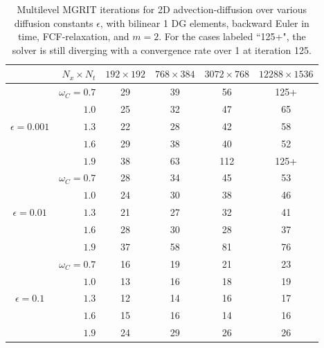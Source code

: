 \documentclass[VANCOUVER,STIX1COL]{WileyNJD-v2}
\begin{document}
\begin{table}[h!]
\centering
\begin{tabular}{c r|c|c|c|c}
     & $N_x \times N_t$ & $192 \times 192$ & $768 \times 384$ & $3072 \times 768$ & $12288 \times 1536$ \\  \toprule
     \multirow{5}{*}{$\epsilon=0.001$} & $\omega_C=0.7$  & 29  & 39  & 56  & 125+ \\ 
     &$1.0$           & 25 & 32 & 47 & 65 \\ 
     &$1.3$           & 22 & 28 & 42 & 58 \\ 
     &$1.6$           & 29 & 38 & 40 & 52 \\ 
     &$1.9$           & 38 & 63 & 112& 125+ \\ \midrule
     \multirow{5}{*}{$\epsilon=0.01$} & $\omega_C=0.7$  & 28 & 34 & 45 & 53 \\ 
     & $1.0$          & 24 & 30 & 38 & 46 \\ 
     &$1.3$           & 21 & 27 & 32 & 41 \\ 
     &$1.6$           & 28 & 30 & 28 & 37 \\ 
     &$1.9$           & 37 & 58 & 81 & 76 \\  \midrule
     \multirow{5}{*}{$\epsilon=0.1$} & $\omega_C=0.7$ & 16 & 19 & 21 & 23 \\ 
     & $1.0$          & 13 & 16 & 18 & 19 \\ 
     &$1.3$           & 12 & 14 & 16 & 17 \\ 
     &$1.6$           & 15 & 16 & 14 & 16 \\ 
     &$1.9$           & 24 & 29 & 26 & 26 \\ \bottomrule
\end{tabular}
\caption{Multilevel MGRIT iterations for 2D advection-diffusion over various diffusion constants $\epsilon$, with bilinear 1 DG elements, backward Euler in time, FCF-relaxation, and $m=2$.  For the cases labeled ``125+", the solver is still diverging with a convergence rate over 1 at iteration 125.}
\label{tab:order1_CD}
\end{table}
\end{document}

